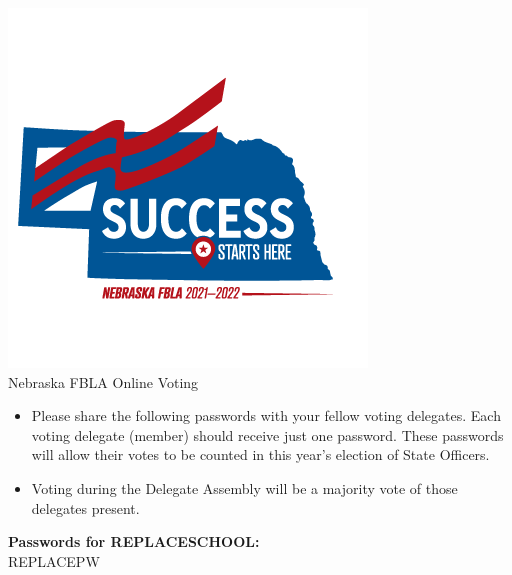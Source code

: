 \documentclass{article}
\begin{document}
\begin{center}

\includegraphics[width=0.8\paperwidth]{pdfs/template/logo.png} \\

{\Huge Nebraska FBLA Online Voting}

\end{center}

\thispagestyle{empty}

{
    \begin{itemize}
    \large
    \item Please share the following passwords with your fellow voting
    delegates. Each voting delegate (member) should receive just one
    password. These passwords will allow their votes to be counted in
    this year’s election of State Officers.

    \item Voting during the Delegate Assembly will be a majority vote of
    those delegates present.

    \end{itemize}
}

\large
\centering
\textbf{Passwords for REPLACESCHOOL:} \\
REPLACEPW
\centering
\end{document}
